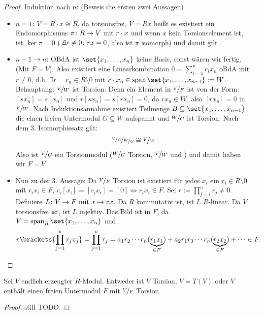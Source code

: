 \begin{proof}
	Induktion nach $n$: (Beweis die ersten zwei Aussagen)
	\begin{itemize}
		\item $n=1$: $V = R\cdot x \cong R$, da torsionsfrei, $V = Rx$ heißt es existiert ein Endomorphismus $\pi\colon R \to V \mit r \cdot x$ und wenn $x$ kein Torsionselement ist, ist $\ker \pi = 0$ ($\not \exists r \neq 0 \colon rx = 0$, also ist $\pi$ isomorph) und damit gilt .
		\item $n-1 \to n$: OBdA ist $\set{x_1, \dots, x_n}$ keine Basis, sonst wären wir fertig. (Mit $F = V$). Also existiert eine Linearkombination $0 = \sum_{i=1}^n r_i x_n$ oBdA mit $r \neq 0$, d.h. $\exists r = r_n \in R \setminus{0}$ mit $r\cdot x_n \in \Span\set{x_1, \dots, x_{n-1}} := W$.\\
		Behauptung: $\lnkset{V}{W}$ ist Torsion: Denn ein Element in $\lnkset{V}{F}$ ist von der Form: $[s x_n] = s[x_n]$ und $r[s x_n] = s[r x_n] = 0$, da $r x_n \in W$, also $[r x_n] = 0$ in $\lnkset{V}{W}$. Nach Induktionsannahme existiert Teilmenge $B \subseteq \set{x_1, \dots, x_{n-1}}$, die einen freien Untermodul $G \subseteq W$ aufspannt und $\lnkset{W}{G}$ ist Torsion. Nach dem 3. Isomorphiesatz gilt:
		\begin{align*}
			\lnkset{\lnkset{V}{G}}{\lnkset{W}{G}} \cong \lnkset{V}{W}
		\end{align*}
		Also ist $\lnkset{V}{G}$ ein Torsionmodul ($\lnkset{W}{G}$ Torsion, $\lnkset{V}{W}$ und ) und damit haben wir $F = V$.
		\item Nun zu der 3. Aussage: Da $\lnkset{V}{F}$ Torsion ist existiert für jedes $x_i$ ein $r_i \in R\setminus{0}$ mit $r_i x_i \in F$, $r_i[x_i] = [r_i x_i] = [0] \Leftrightarrow r_i x_i \in F$. Sei $r := \prod_{j=i}^n r_j \neq 0$. Definiere $L\colon V \to F \mit x \mapsto rx$. Da $R$ kommutativ ist, ist $L$ $R$-linear. Da $V$ torsionsfrei ist, ist $L$ injektiv. Das Bild ist in $F$, da $V = \Span_R\set{x_1, \dots, x_n}$ und
		\begin{align*}
			r\brackets{\prod_{j=1}^n r_j x_j} = \prod_{j=1}^n r_j = a_1 r_2\cdots r_n (\underbrace{r_1 x_1}_{\in F}) + a_2 r_1 r_3 \cdots r_n(\underbrace{r_2 x_2}_{\in F}) + \dots \in F.
		\end{align*}
	\end{itemize}
\end{proof}
\begin{conclusion}
	Sei $V$ endlich erzeugter $R$-Modul. Entweder ist $V$ Torsion, $V = T(V)$ oder $V$ enthält einen freien Untermodul $F$ mit $\lnkset{V}{F}$ Torsion.
\end{conclusion}
\begin{proof}
	still TODO.
\end{proof}